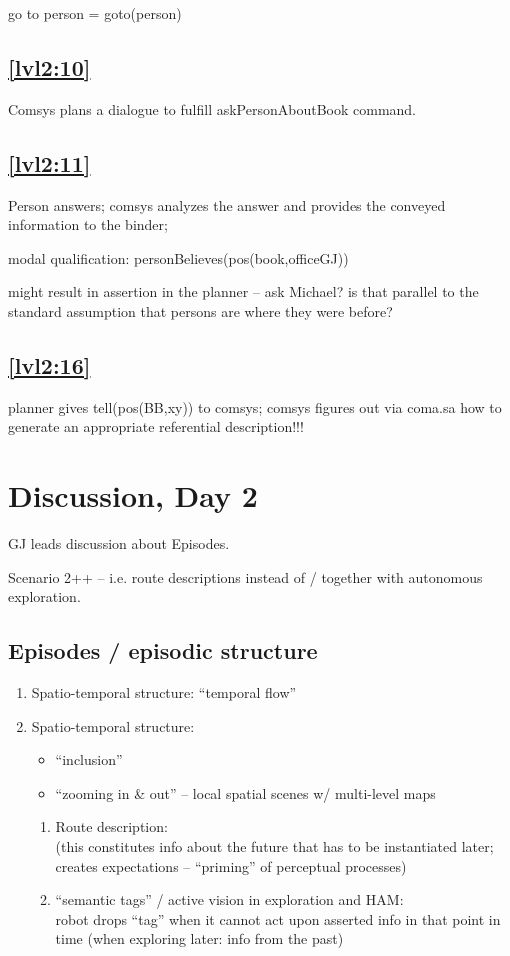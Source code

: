 \documentclass{article}
\begin{document}
	go to person = goto(person)
	
\subsection{\ref{lvl2:10}}
	Comsys plans a dialogue to fulfill askPersonAboutBook command.
	


\subsection{\ref{lvl2:11}}
	Person answers;
	comsys analyzes the answer and provides the conveyed information 
	to the binder;
	
	modal qualification:
	personBelieves(pos(book,officeGJ))

	might result in assertion in the planner -- ask Michael?
	is that parallel to the standard assumption that persons are where they were before?
	

\subsection{\ref{lvl2:16}} planner gives tell(pos(BB,xy)) to comsys; comsys figures out via 
	coma.sa how to generate an appropriate referential description!!!

\section{Discussion, Day 2}
GJ leads discussion about Episodes.

Scenario 2++ -- i.e. route descriptions instead of / together with autonomous exploration.

\subsection{Episodes / episodic structure}
\begin{enumerate} 
	\item Spatio-temporal structure: ``temporal flow''
	\item Spatio-temporal structure:
	\begin{itemize}
		\item ``inclusion''
		\item ``zooming in \& out'' -- local spatial scenes w/ multi-level maps
	\end{itemize}
	\begin{enumerate}
		\item Route description:\\
				(this constitutes info about the future that has to be instantiated later;
				creates expectations -- ``priming'' of perceptual processes)
		\item ``semantic tags'' / active vision in exploration and HAM:\\
				robot drops ``tag'' when it cannot act upon asserted info in that point in time
				(when exploring later: info from the past)
	
	\end{enumerate}

\end{enumerate}
\end{document}
